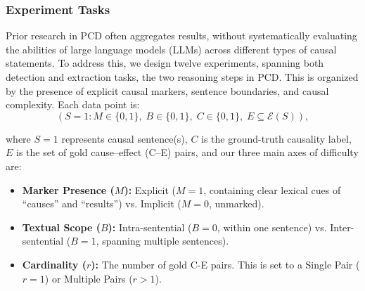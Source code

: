 \documentclass[conference]{IEEEtran}
\newcommand{\sun}[1]{\textcolor{blue}{[SC: #1]}}
\begin{document}

\subsubsection{Experiment Tasks}

Prior research in PCD often aggregates results, without systematically evaluating the abilities of large language models (LLMs) across different types of causal statements. To address this, we design twelve experiments, spanning both detection and extraction tasks, the two reasoning steps in PCD. This is organized by the presence of explicit causal markers, sentence boundaries, and causal complexity. Each data point is:
\begin{equation}
(S =1 : M \in \{0,1\},\; B \in \{0,1\},\; C \in \{0,1\},\; E \subseteq \mathcal{E}(S)),
\end{equation}


where $S = 1$ represents causal sentence(s), $C$ is the ground-truth causality label, $E$ is the set of gold cause–effect (C–E) pairs, and our three main axes of difficulty are:

\begin{itemize}[leftmargin=*]
    \item \textbf{Marker Presence ($M$):} Explicit ($M=1$, containing clear lexical cues of ``causes'' and ``results'') vs. Implicit ($M=0$, unmarked).
    \item \textbf{Textual Scope ($B$):} Intra-sentential ($B=0$, within one sentence) vs. Inter-sentential ($B=1$, spanning multiple sentences).
    \item \textbf{Cardinality ($r$):} The number of gold C-E pairs. This is set to a Single Pair ($r=1$) or Multiple Pairs ($r>1$).
\end{itemize}
\end{document}
